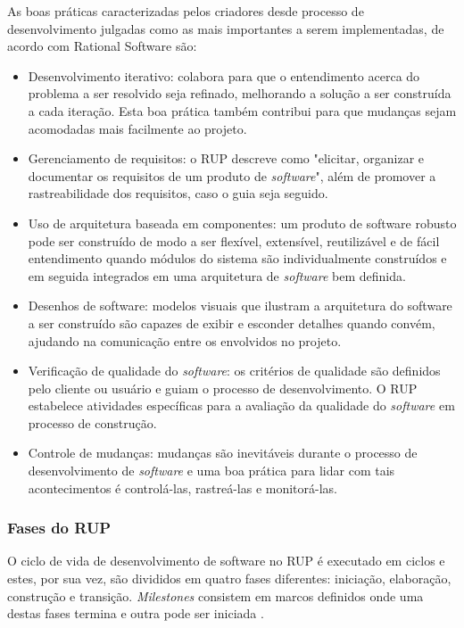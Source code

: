 As boas práticas caracterizadas pelos criadores desde processo de desenvolvimento julgadas como as mais importantes a serem implementadas, de acordo com Rational Software \cite{rational_software_rational_1998} são:

\begin{itemize}
\item Desenvolvimento iterativo: colabora para que o entendimento acerca do problema a ser resolvido seja refinado, melhorando a solução a ser construída a cada iteração. Esta boa prática também contribui para que mudanças sejam acomodadas mais facilmente ao projeto.

\item Gerenciamento de requisitos: o RUP descreve como "elicitar, organizar e documentar os requisitos de um produto de \textit{software}", além de promover a rastreabilidade dos requisitos, caso o guia seja seguido.

\item Uso de arquitetura baseada em componentes: um produto de software robusto pode ser construído de modo a ser flexível, extensível, reutilizável e de fácil entendimento quando módulos do sistema são individualmente construídos e em seguida integrados em uma arquitetura de \textit{software} bem definida.

\item Desenhos de software: modelos visuais que ilustram a arquitetura  do software a ser construído são capazes de exibir e esconder detalhes quando convém, ajudando na comunicação entre os envolvidos no projeto.

\item Verificação de qualidade do \textit{software}: os critérios de qualidade são definidos pelo cliente ou usuário e guiam o processo de desenvolvimento. O RUP estabelece atividades específicas para a avaliação da qualidade do \textit{software} em processo de construção.

\item Controle de mudanças: mudanças são inevitáveis durante o processo de desenvolvimento de \textit{software} e uma boa prática para lidar com tais acontecimentos é controlá-las, rastreá-las e monitorá-las. 
\end{itemize}

\subsubsection{Fases do RUP}
O ciclo de vida de desenvolvimento de software no RUP é executado em ciclos e estes, por sua vez, são divididos em quatro fases diferentes: iniciação, elaboração, construção e transição. \textit{Milestones} consistem em marcos definidos onde uma destas fases termina e outra pode ser iniciada \cite{rational_software_rational_1998}. 

